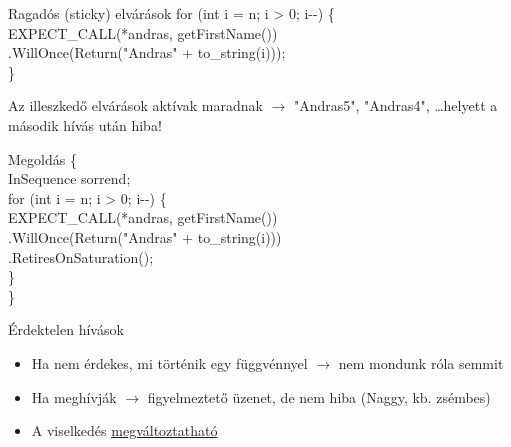 \documentclass[usenames,dvipsnames,aspectratio=169]{beamer}
\newcommand{\hiv}[1]{{\color{hivatkozasszin}#1}}
\begin{document}
\begin{frame}
    \small
    \begin{exampleblock}{Ragadós (sticky) elvárások}
        \scriptsize
        for (int i = n; i > 0; i-{-}) \{ \\
        \qquad EXPECT\_CALL(*andras, getFirstName()) \\
        \qquad\qquad .WillOnce(Return("Andras" + to\_string(i))); \\
        \}
    \end{exampleblock}
    Az illeszkedő elvárások aktívak maradnak $\to$ "Andras5", "Andras4", \dots helyett a második hívás után hiba!
    \begin{exampleblock}{Megoldás}
        \scriptsize
        \{ \\ %
        \qquad InSequence sorrend; \\
        \smallskip
        \qquad for (int i = n; i > 0; i-{-}) \{ \\
        \qquad\qquad EXPECT\_CALL(*andras, getFirstName()) \\
        \qquad\qquad\qquad .WillOnce(Return("Andras" + to\_string(i))) \\
        \qquad\qquad\qquad .RetiresOnSaturation(); \\
        \qquad \} \\
        \} %
    \end{exampleblock}
\end{frame}

\begin{frame}
    Érdektelen hívások
    \begin{itemize}
        \item Ha nem érdekes, mi történik egy függvénnyel $\to$ nem mondunk róla semmit
        \item Ha meghívják $\to$ figyelmeztető üzenet, de nem hiba (Naggy, kb. zsémbes)
        \item A viselkedés \hiv{\href{https://google.github.io/googletest/gmock\_cook\_book.html\#NiceStrictNaggy}{megváltoztatható}}
    \end{itemize}
\end{frame}
\end{document}

